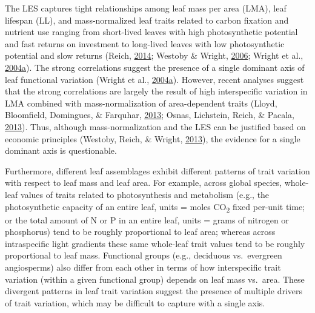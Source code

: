 \documentclass[12pt,]{article}
\theoremstyle{definition}
\theoremstyle{definition}
\theoremstyle{definition}
\theoremstyle{remark}
\begin{document}
The LES captures tight relationships among leaf mass per area (LMA),
leaf lifespan (LL), and mass-normalized leaf traits related to carbon
fixation and nutrient use ranging from short-lived leaves with high
photosynthetic potential and fast returns on investment to long-lived
leaves with low photosynthetic potential and slow returns (Reich,
\protect\hyperlink{ref-Reich2014}{2014}; Westoby \& Wright,
\protect\hyperlink{ref-Westoby2006a}{2006}; Wright et al.,
\protect\hyperlink{ref-Wright2004a}{2004}\protect\hyperlink{ref-Wright2004a}{a}).
The strong correlations suggest the presence of a single dominant axis
of leaf functional variation (Wright et al.,
\protect\hyperlink{ref-Wright2004a}{2004}\protect\hyperlink{ref-Wright2004a}{a}).
However, recent analyses suggest that the strong correlations are
largely the result of high interspecific variation in LMA combined with
mass-normalization of area-dependent traits (Lloyd, Bloomfield,
Domingues, \& Farquhar, \protect\hyperlink{ref-Lloyd2013}{2013}; Osnas,
Lichstein, Reich, \& Pacala, \protect\hyperlink{ref-Osnas2013}{2013}).
Thus, although mass-normalization and the LES can be justified based on
economic principles (Westoby, Reich, \& Wright,
\protect\hyperlink{ref-Westoby2013}{2013}), the evidence for a single
dominant axis is questionable.

Furthermore, different leaf assemblages exhibit different patterns of
trait variation with respect to leaf mass and leaf area. For example,
across global species, whole-leaf values of traits related to
photosynthesis and metabolism (e.g., the photosynthetic capacity of an
entire leaf, units = moles CO\textsubscript{2} fixed per-unit time; or
the total amount of N or P in an entire leaf, units = grams of nitrogen
or phosphorus) tend to be roughly proportional to leaf area; whereas
across intraspecific light gradients these same whole-leaf trait values
tend to be roughly proportional to leaf mass. Functional groups (e.g.,
deciduous vs.~evergreen angiosperms) also differ from each other in
terms of how interspecific trait variation (within a given functional
group) depends on leaf mass vs.~area. These divergent patterns in leaf
trait variation suggest the presence of multiple drivers of trait
variation, which may be difficult to capture with a single axis.
\end{document}
